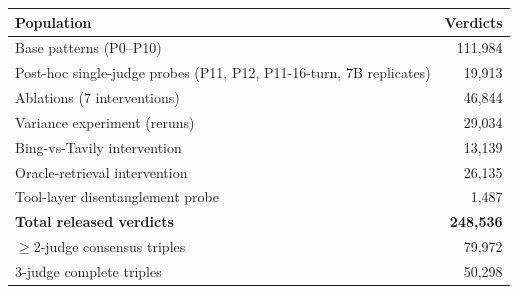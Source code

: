 \begin{tabular}{lr}
\toprule
Population & Verdicts\\
\midrule
Base patterns (P0--P10) & 111,984\\
Post-hoc single-judge probes (P11, P12, P11-16-turn, 7B replicates) & 19,913\\
Ablations (7 interventions) & 46,844\\
Variance experiment (reruns) & 29,034\\
Bing-vs-Tavily intervention & 13,139\\
Oracle-retrieval intervention & 26,135\\
Tool-layer disentanglement probe & 1,487\\
\midrule
\textbf{Total released verdicts} & \textbf{248,536}\\
$\geq$2-judge consensus triples & 79,972\\
3-judge complete triples & 50,298\\
\bottomrule
\end{tabular}
